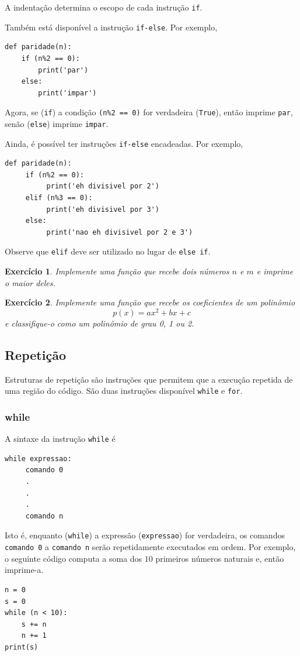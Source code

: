 \documentclass[12pt]{article}
\newtheorem{exr}{Exercício}[section]
\begin{document}
\begin{obs}
  A indentação determina o escopo de cada instrução \lstinline+if+.
\end{obs}

Também está disponível a instrução \lstinline+if-else+. Por exemplo,
\begin{lstlisting}
def paridade(n):
    if (n%2 == 0):
        print('par')
    else:
        print('impar')    
\end{lstlisting}
Agora, se (\lstinline+if+) a condição \lstinline!(n%2 == 0)! for verdadeira (\lstinline+True+), então imprime \lstinline+par+, senão (\lstinline+else+) imprime \lstinline+impar+.

Ainda, é possível ter instruções \lstinline+if-else+ encadeadas. Por exemplo,
\begin{lstlisting}
def paridade(n):
     if (n%2 == 0):
          print('eh divisivel por 2')
     elif (n%3 == 0):
          print('eh divisivel por 3')
     else:
          print('nao eh divisivel por 2 e 3')    
\end{lstlisting}
Observe que \lstinline+elif+ deve ser utilizado no lugar de \lstinline+else if+.

\begin{exr}
  Implemente uma função que recebe dois números $n$ e $m$ e imprime o maior deles.
\end{exr}

\begin{exr}
  Implemente uma função que recebe os coeficientes de um polinômio
  \begin{equation}
    p(x) = ax^2 + bx + c
  \end{equation}
  e classifique-o como um polinômio de grau 0, 1 ou 2.
\end{exr}

\subsection{Repetição}

Estruturas de repetição são instruções que permitem que a execução repetida de uma região do código. São duas instruções disponível \lstinline+while+ e \lstinline+for+.

\subsubsection{while}

A sintaxe da instrução \lstinline+while+ é
\begin{lstlisting}
while expressao:
     comando 0
     .
     .
     .
     comando n
\end{lstlisting}
Isto é, enquanto (\lstinline+while+) a expressão (\lstinline+expressao+) for verdadeira, os comandos \lstinline+comando 0+ a \lstinline+comando n+ serão repetidamente executados em ordem. Por exemplo, o seguinte código computa a soma dos $10$ primeiros números naturais e, então imprime-a.
\begin{lstlisting}
n = 0
s = 0
while (n < 10):
    s += n
    n += 1
print(s)
\end{lstlisting}
\end{document}

